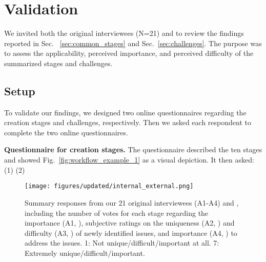 \section{Validation}
\label{sec:validation}

We invited both the original interviewees (N=21) and  to review the findings reported in Sec.
~\ref{sec:common_stages} and Sec.~\ref{sec:challenges}. The purpose was to assess the applicability, perceived importance, and perceived difficulty of the summarized stages and challenges.


\subsection{Setup}
To validate our findings, we designed two online questionnaires regarding the creation stages and challenges, respectively. Then we asked each respondent to complete the two online questionnaires. 

\textbf{Questionnaire for creation stages.}  The questionnaire described the ten stages and showed Fig.~\ref{fig:workflow_example_1} as a visual depiction. It then asked: (1)  (2) 


\begin{figure*}[!tb]
    \centering
    \texttt{[image: figures/updated/internal\_external.png]}
    \vspace{-6mm}
    \caption{Summary responses from our 21 original interviewees (A1-A4) and , including the number of votes for each stage regarding the importance (A1, ), subjective ratings on the uniqueness (A2, ) and difficulty (A3, ) of newly identified issues, and importance (A4, ) to address the issues. 1: Not unique/difficult/important at all. 7: Extremely unique/difficult/important.} 
    \label{fig:interviewee_rating}
\end{figure*}

